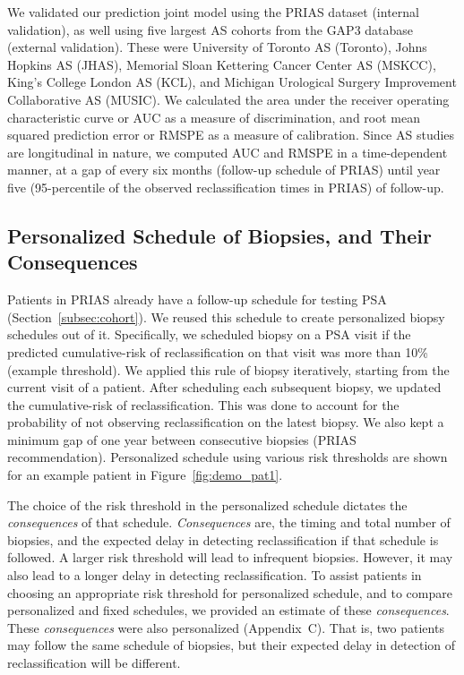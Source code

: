 We validated our prediction joint model using the PRIAS dataset (internal validation), as well using five largest AS cohorts from the GAP3 database \citep{gap3_2018} (external validation). These were University of Toronto AS (Toronto), Johns Hopkins AS (JHAS), Memorial Sloan Kettering Cancer Center AS (MSKCC), King's College London AS (KCL), and Michigan Urological Surgery Improvement Collaborative AS (MUSIC). We calculated the area under the receiver operating characteristic curve or AUC \cite{rizopoulos2017dynamic} as a measure of discrimination, and root mean squared prediction error or RMSPE \cite{rizopoulos2017dynamic} as a measure of calibration. Since AS studies are longitudinal in nature, we computed AUC and RMSPE in a time-dependent manner, at a gap of every six months (follow-up schedule of PRIAS) until year five (95-percentile of the observed reclassification times in PRIAS) of follow-up.

\subsection{Personalized Schedule of Biopsies, and Their Consequences}
Patients in PRIAS already have a follow-up schedule for testing PSA (Section~\ref{subsec:cohort}). We reused this schedule to create personalized biopsy schedules out of it. Specifically, we scheduled biopsy on a PSA visit if the predicted cumulative-risk of reclassification on that visit was more than 10\% (example threshold). We applied this rule of biopsy iteratively, starting from the current visit of a patient. After scheduling each subsequent biopsy, we updated the cumulative-risk of reclassification. This was done to account for the probability of not observing reclassification on the latest biopsy. We also kept a minimum gap of one year between consecutive biopsies (PRIAS recommendation). Personalized schedule using various risk thresholds are shown for an example patient in Figure~\ref{fig:demo_pat1}.

The choice of the risk threshold in the personalized schedule dictates the \textit{consequences} of that schedule. \textit{Consequences} are, the timing and total number of biopsies, and the expected delay in detecting reclassification if that schedule is followed. A larger risk threshold will lead to infrequent biopsies. However, it may also lead to a longer delay in detecting reclassification. To assist patients in choosing an appropriate risk threshold for personalized schedule, and to compare personalized and fixed schedules, we provided an estimate of these \textit{consequences}. These \textit{consequences} were also personalized (Appendix~C). That is, two patients may follow the same schedule of biopsies, but their expected delay in detection of reclassification will be different.

